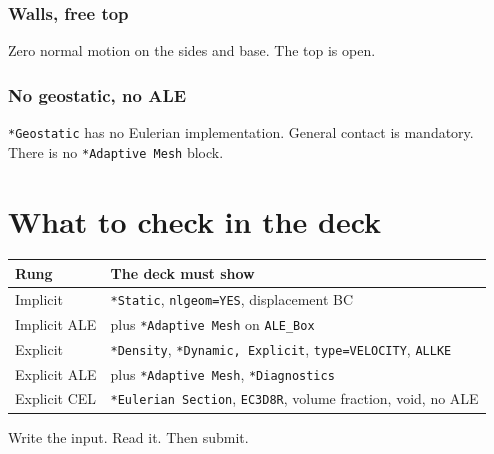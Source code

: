 \documentclass[11pt,a4paper]{article}
\begin{document}
\subsubsection*{Walls, free top}

Zero normal motion on the sides and base. The top is open.



\subsubsection*{No geostatic, no ALE}

\texttt{*Geostatic} has no Eulerian implementation. General contact is
mandatory. There is no \texttt{*Adaptive Mesh} block.

\section{What to check in the deck}

\begin{center}
\small
\begin{tabular}{@{}ll@{}}
\toprule
Rung & The deck must show \\
\midrule
Implicit & \texttt{*Static}, \texttt{nlgeom=YES}, displacement BC \\
Implicit ALE & plus \texttt{*Adaptive Mesh} on \texttt{ALE\_Box} \\
Explicit & \texttt{*Density}, \texttt{*Dynamic, Explicit},
  \texttt{type=VELOCITY}, \texttt{ALLKE} \\
Explicit ALE & plus \texttt{*Adaptive Mesh}, \texttt{*Diagnostics} \\
Explicit CEL & \texttt{*Eulerian Section}, \texttt{EC3D8R},
  volume fraction, void, no ALE \\
\bottomrule
\end{tabular}
\end{center}

Write the input. Read it. Then submit.
\end{document}
